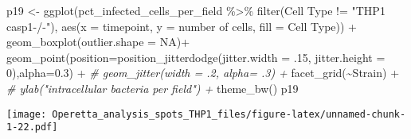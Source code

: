 \documentclass[
]{article}
\newenvironment{Shaded}{\begin{snugshade}}{\end{snugshade}}
\newcommand{\AttributeTok}[1]{\textcolor[rgb]{0.77,0.63,0.00}{#1}}
\newcommand{\CommentTok}[1]{\textcolor[rgb]{0.56,0.35,0.01}{\textit{#1}}}
\newcommand{\ConstantTok}[1]{\textcolor[rgb]{0.00,0.00,0.00}{#1}}
\newcommand{\DecValTok}[1]{\textcolor[rgb]{0.00,0.00,0.81}{#1}}
\newcommand{\FloatTok}[1]{\textcolor[rgb]{0.00,0.00,0.81}{#1}}
\newcommand{\FunctionTok}[1]{\textcolor[rgb]{0.00,0.00,0.00}{#1}}
\newcommand{\NormalTok}[1]{#1}
\newcommand{\OtherTok}[1]{\textcolor[rgb]{0.56,0.35,0.01}{#1}}
\newcommand{\SpecialCharTok}[1]{\textcolor[rgb]{0.00,0.00,0.00}{#1}}
\newcommand{\StringTok}[1]{\textcolor[rgb]{0.31,0.60,0.02}{#1}}
\begin{document}
\begin{Shaded}
\begin{Highlighting}[]
\NormalTok{p19 }\OtherTok{\textless{}{-}} \FunctionTok{ggplot}\NormalTok{(pct\_infected\_cells\_per\_field }\SpecialCharTok{\%\textgreater{}\%}
                \FunctionTok{filter}\NormalTok{(}\StringTok{\textasciigrave{}}\AttributeTok{Cell Type}\StringTok{\textasciigrave{}} \SpecialCharTok{!=} \StringTok{"THP1 casp1{-}/{-}"}\NormalTok{), }\FunctionTok{aes}\NormalTok{(}\AttributeTok{x =}\NormalTok{ timepoint, }\AttributeTok{y =} \StringTok{\textasciigrave{}}\AttributeTok{number of cells}\StringTok{\textasciigrave{}}\NormalTok{, }\AttributeTok{fill =} \StringTok{\textasciigrave{}}\AttributeTok{Cell Type}\StringTok{\textasciigrave{}}\NormalTok{)) }\SpecialCharTok{+}
  \FunctionTok{geom\_boxplot}\NormalTok{(}\AttributeTok{outlier.shape =} \ConstantTok{NA}\NormalTok{)}\SpecialCharTok{+}
  \FunctionTok{geom\_point}\NormalTok{(}\AttributeTok{position=}\FunctionTok{position\_jitterdodge}\NormalTok{(}\AttributeTok{jitter.width =}\NormalTok{ .}\DecValTok{15}\NormalTok{, }\AttributeTok{jitter.height =} \DecValTok{0}\NormalTok{),}\AttributeTok{alpha=}\FloatTok{0.3}\NormalTok{) }\SpecialCharTok{+}
  \CommentTok{\#  geom\_jitter(width = .2, alpha= .3) +}
  \FunctionTok{facet\_grid}\NormalTok{(}\SpecialCharTok{\textasciitilde{}}\NormalTok{Strain) }\SpecialCharTok{+}
  \CommentTok{\#  ylab("intracellular bacteria per field") +}
  \FunctionTok{theme\_bw}\NormalTok{()}
\NormalTok{p19}
\end{Highlighting}
\end{Shaded}

\texttt{[image: Operetta\_analysis\_spots\_THP1\_files/figure-latex/unnamed-chunk-1-22.pdf]}
\end{document}
